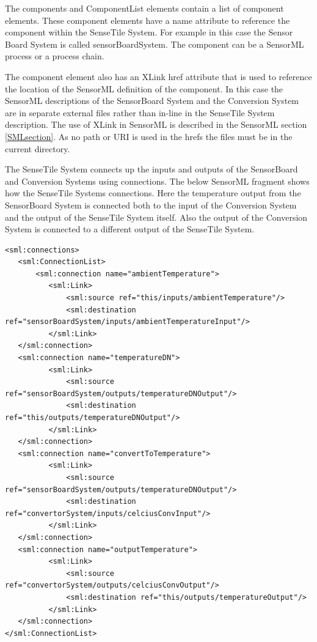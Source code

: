 \documentclass[]{final_report}
\begin{document}
The components and ComponentList elements contain a list of component elements. These component elements have a name attribute to reference the component within the SenseTile System. For example in this case the Sensor Board System is called sensorBoardSystem. The component can be a SensorML process or a process chain.

The component element also has an XLink href attribute that is used to reference the location of the SensorML definition of the component.  In this case the SensorML descriptions of the SensorBoard System and the Conversion System are in separate external files rather than in-line in the SenseTile System description. The use of XLink in SensorML is described in the SensorML section \ref{SMLsection}. As no path or URI is used in the hrefs the files must be in the current directory.

The SenseTile System connects up the inputs and outputs of the SensorBoard and Conversion Systems using connections. The below SensorML fragment shows how the SenseTile Systems connections. Here the temperature output from the SensorBoard System is connected both to the input of the Conversion System and the output of the SenseTile System itself. Also the output of the Conversion System is connected to a different output of the SenseTile System.

\begin{lstlisting}
<sml:connections>
   <sml:ConnectionList>
       <sml:connection name="ambientTemperature">
          <sml:Link>
              <sml:source ref="this/inputs/ambientTemperature"/>
              <sml:destination ref="sensorBoardSystem/inputs/ambientTemperatureInput"/>
          </sml:Link>
   </sml:connection>
   <sml:connection name="temperatureDN">
          <sml:Link>
              <sml:source ref="sensorBoardSystem/outputs/temperatureDNOutput"/>
              <sml:destination ref="this/outputs/temperatureDNOutput"/>
          </sml:Link>
   </sml:connection>
   <sml:connection name="convertToTemperature">
          <sml:Link>
              <sml:source ref="sensorBoardSystem/outputs/temperatureDNOutput"/>
              <sml:destination ref="convertorSystem/inputs/celciusConvInput"/>
          </sml:Link>
   </sml:connection>
   <sml:connection name="outputTemperature">
          <sml:Link>
              <sml:source ref="convertorSystem/outputs/celciusConvOutput"/>
              <sml:destination ref="this/outputs/temperatureOutput"/>
          </sml:Link>
   </sml:connection>
</sml:ConnectionList>
\end{lstlisting}
\end{document}
